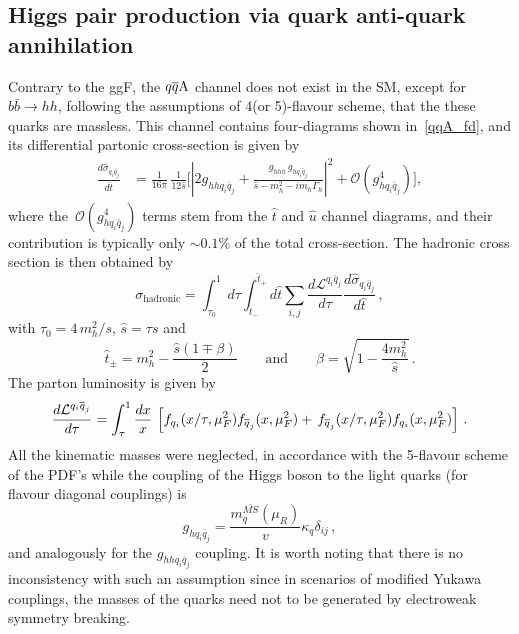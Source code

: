 \subsection{Higgs pair production via quark anti-quark annihilation}
Contrary to the ggF, the $\qqA$ channel does not exist in the SM, except for $b\bar b \to hh$, following the assumptions of 4(or 5)-flavour scheme, that the these quarks are massless.  This channel contains four-diagrams shown in~\autoref{qqA_fd}, and its  differential partonic cross-section is given by 
\begin{align}
	\frac{d \hat \sigma_{q_i\bar{q}_j}}{d \hat t} &= \frac{1}{16 \pi}\, \frac{1}{12  \hat{s}} \bigg[ \left| 2  g_{hh q_i \bar q_j} + \frac{g_{hhh}\, g_{h q_i \bar q_j}}{\hat{s}-m_h^2-im_h\Gamma_h}\right|^2+ \mathcal{O}(g_{h q_i \bar q_j}^4) \bigg],
	\label{sigmaqqa}
\end{align}
where the~$ \mathcal{O}(g_{h q_i \bar q_j}^4)$ terms stem from the $\hat{t}$ and $\hat{u}$ channel diagrams, and their contribution is typically only $\sim 0.1 \%$ of the total cross-section.
The hadronic cross section is then obtained by
\begin{equation}
	\sigma_{\mathrm{hadronic}} =  \int_{\tau_0}^1 d\tau \int_{\hat{t}_-}^{\hat{t}_+} d\hat{t} \sum_{i,j} \frac{d\mathcal{L}^{q_i\bar{q}_j}}{d\tau}\frac{ d\hat \sigma_{q_i\bar{q}_j}}{d \hat t}\,, \label{eq:sigmahadron}
\end{equation}
with $ \tau_0= 4\, m_h^2/s$, $\hat{s}=\tau s$ and
\begin{equation}
	\hat{t}_{\pm}=m_h^2-\frac{\hat{s}(1\mp \beta)}{2} \quad\quad \text{and}\quad \quad \beta=\sqrt{1-\frac{4 m_h^2}{\hat{s}}}\,.
\end{equation}
The parton luminosity is given by
\begin{equation}
	\frac{d{\cal L}^{q_i \bar q_j}}{d\tau} = \int_\tau ^1 \frac{dx}{x} \,\left[  f_{q_i}(x/\tau,\mu_F^2) f_{\bar{q}_j}(x,\mu_F^2) + \,f_{\bar{q}_j}(x/\tau,\mu_F^2) f_{q_i}(x,\mu_F^2)\right]\,.
\end{equation}
All the kinematic masses were neglected, in accordance with the 5-flavour scheme of the PDF's while the coupling of the Higgs boson to the light quarks (for flavour diagonal couplings) is
\begin{equation}
	g_{hq_i\bar{q}_j}=\frac{m^{\bar{MS}}_q(\mu_R)}{v}  \kappa_q \delta_{ij}\,,
\end{equation}
and analogously for the $g_{hhq_i\bar{q}_j}$ coupling.  It is worth noting that there is no inconsistency with such an assumption since in scenarios of modified Yukawa couplings, the masses of the quarks need not to be generated by electroweak symmetry breaking.
